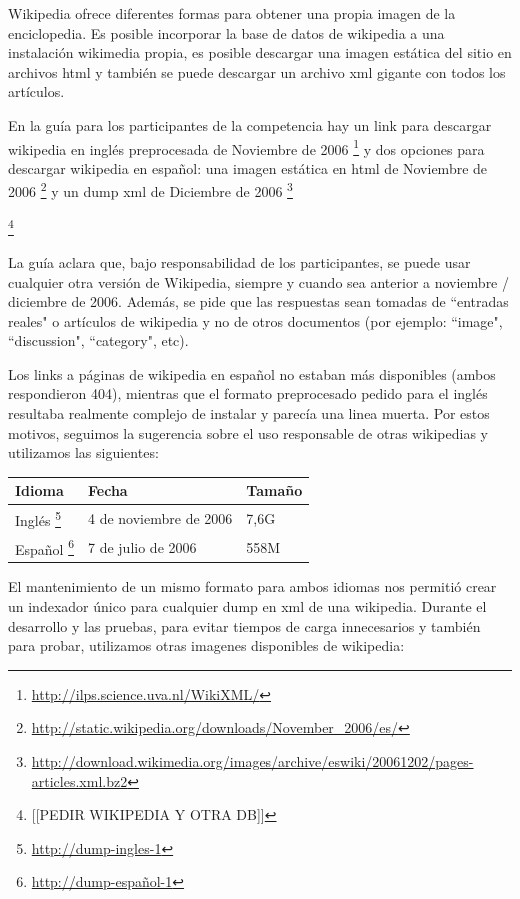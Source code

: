 Wikipedia ofrece diferentes formas para obtener una propia imagen de la enciclopedia.
Es posible incorporar la base de datos de wikipedia a una instalación wikimedia
propia, es posible descargar una imagen estática del sitio en archivos html y también se puede
descargar un archivo xml gigante con todos los artículos. 

En la guía para los participantes de la competencia \cite{Clef07} hay un link para descargar 
wikipedia en inglés preprocesada de Noviembre de 2006 \footnote{\url{http://ilps.science.uva.nl/WikiXML/}} y dos opciones para descargar wikipedia en español: una imagen estática en html de Noviembre de 2006 \footnote{\url{http://static.wikipedia.org/downloads/November_2006/es/}} y un dump xml de Diciembre de 2006 
\footnote{\url{http://download.wikimedia.org/images/archive/eswiki/20061202/pages-articles.xml.bz2}}

\footnote{[[PEDIR WIKIPEDIA Y OTRA DB]]}

La guía aclara que, bajo responsabilidad de los participantes, se puede usar
cualquier otra versión de Wikipedia, siempre y cuando sea anterior a noviembre / diciembre de 2006.
Además, se pide que las respuestas sean tomadas de ``entradas reales" o artículos de wikipedia y
no de otros documentos (por ejemplo: ``image", ``discussion", ``category", etc).

Los links a páginas de wikipedia en español no estaban más disponibles (ambos respondieron 404), mientras que el formato
preprocesado pedido para el inglés resultaba realmente complejo de instalar y parecía una linea muerta. Por estos motivos,
seguimos la sugerencia sobre el uso responsable de otras wikipedias y utilizamos las siguientes:

\medskip

\begin{center}
\begin{tabular}{ | l | l | l |}
    \hline
    Idioma & Fecha & Tamaño\\ \hline
    Inglés \footnote{\url{http://dump-ingles-1}} & 4 de noviembre de 2006 & 7,6G \\ \hline
    Español \footnote{\url{http://dump-español-1}} & 7 de julio de 2006 & 558M \\ \hline
\end{tabular}  
\end{center}

El mantenimiento de un mismo formato para ambos idiomas nos permitió crear un indexador único para cualquier
dump en xml de una wikipedia. Durante el desarrollo y las pruebas, para evitar tiempos de carga innecesarios y también
para probar, utilizamos otras imagenes disponibles de wikipedia:

